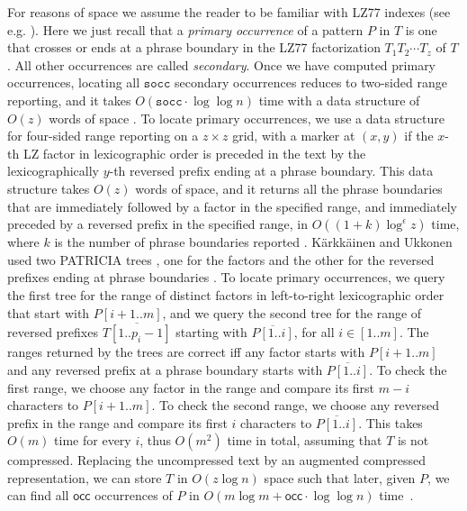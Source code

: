 \documentclass[a4paper,UKenglish]{lipics-v2016}
\newcommand{\REV}[1]{\ensuremath{\overline{#1}}}
\newcommand{\occ}
  {\ensuremath{\mathsf{occ}}}
\begin{document}
For reasons of space we assume the reader to be familiar with LZ77 indexes (see e.g. \cite{gagie2014lz77,karkkainen1996lempel}). Here we just recall that a \emph{primary occurrence} of a pattern $P$ in $T$ is one that crosses or ends at a phrase boundary in the LZ77 factorization $T_1 T_2 \cdots T_{z}$ of $T$. All other occurrences are called \emph{secondary}. Once we have computed primary occurrences, locating all $\mathtt{socc}$ secondary occurrences reduces to two-sided range reporting, and it takes $O(\mathtt{socc} \cdot \log{\log{n}})$ time with a data structure of $O(z)$ words of space \cite{karkkainen1996lempel}. To locate primary occurrences, we use a data structure for four-sided range reporting on a \(z \times z\) grid, with a marker at \((x, y)\) if the $x$-th LZ factor in lexicographic order is preceded in the text by the lexicographically $y$-th reversed prefix ending at a phrase boundary. This data structure takes $O(z)$ words of space, and it returns all the phrase boundaries that are immediately followed by a factor in the specified range, and immediately preceded by a reversed prefix in the specified range, in $O((1+k)\log^{\epsilon}{z})$ time, where $k$ is the number of phrase boundaries reported \cite{chan2011orthogonal}. K\"arkk\"ainen and Ukkonen used two PATRICIA trees \cite{morrison1968patricia}, one for the factors and the other for the reversed prefixes ending at phrase boundaries \cite{karkkainen1996lempel}. To locate primary occurrences, we query the first tree for the range of distinct factors in left-to-right lexicographic order that start with $P[i+1..m]$, and we query the second tree for the range of reversed prefixes $\REV{T[1..p_i-1]}$ starting with $\REV{P[1..i]}$, for all $i \in [1..m]$. The ranges returned by the trees are correct iff any factor starts with $P[i+1..m]$ and any reversed prefix at a phrase boundary starts with $\REV{P[1..i]}$. To check the first range, we choose any factor in the range and compare its first $m-i$ characters to $P[i+1..m]$. To check the second range, we choose any reversed prefix in the range and compare its first $i$ characters to $\REV{P[1..i]}$. This takes $O(m)$ time for every $i$, thus $O(m^2)$ time in total, assuming that $T$ is not compressed. Replacing the uncompressed text by an augmented compressed representation, we can store $T$ in $O(z \log{n})$ space such that later, given $P$, we can find all $\occ$ occurrences of $P$ in $O(m\log{m} + \occ \cdot \log{\log{n}})$ time~\cite{gagie2014lz77}.
\end{document}
